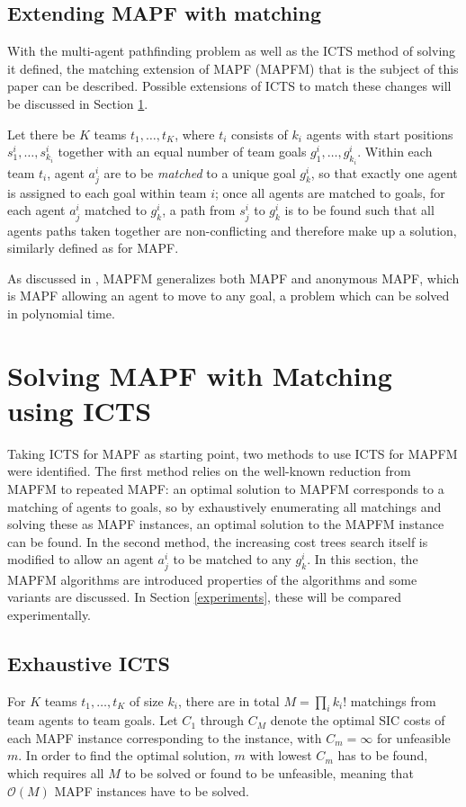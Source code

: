 \documentclass[english,10pt]{article}
\begin{document}
	\subsection{Extending MAPF with matching}
	With the multi-agent pathfinding problem as well as the ICTS method of solving it defined, the matching extension of MAPF (MAPFM) that is the subject of this paper can be described. Possible extensions of ICTS to match these changes will be discussed in Section \ref{section:icts-matching}.
	
	Let there be $K$ teams $t_1,\ldots, t_K$, where $t_i$ consists of $k_i$ agents with start positions $s_1^i,\ldots,s_{k_i}^i$ together with an equal number of team goals $g_1^i,\ldots,g_{k_i}^i$. Within each team $t_i$, agent $a_j^i$ are to be \textit{matched} to a unique goal $g_k^i$, so that exactly one agent is assigned to each goal within team $i$; once all agents are matched to goals, for each agent $a_j^i$ matched to $g_k^i$, a path from $s_j^i$ to $g_k^i$ is to be found such that all agents paths taken together are non-conflicting and therefore make up a solution, similarly defined as for MAPF.
	
	As discussed in \cite{ma2016}, MAPFM generalizes both MAPF and anonymous MAPF, which is MAPF allowing an agent to move to any goal, a problem which can be solved in polynomial time.
	\section{Solving MAPF with Matching using ICTS} %
	\label{section:icts-matching}
	Taking ICTS for MAPF as starting point, two methods to use ICTS for MAPFM were identified. The first method relies on the well-known reduction from MAPFM to repeated MAPF: an optimal solution to MAPFM corresponds to a matching of agents to goals, so by exhaustively enumerating all matchings and solving these as MAPF instances, an optimal solution to the MAPFM instance can be found. In the second method, the increasing cost trees search itself is modified to allow an agent $a_j^i$ to be matched to any $g_k^i$. In this section, the MAPFM algorithms are introduced properties of the algorithms and some variants are discussed. In Section \ref{experiments}, these will be compared experimentally.
	\subsection{Exhaustive ICTS}
	\label{exhaustive}
	For $K$ teams $t_1,\ldots,t_K$ of size $k_i$, there are in total $M = \prod_{i} k_i!$ matchings from team agents to team goals. Let $C_1$ through $C_M$ denote the optimal SIC costs of each MAPF instance corresponding to the instance, with $C_m = \infty$ for unfeasible $m$. In order to find the optimal solution, $m$ with lowest $C_m$ has to be found, which requires all $M$ to be solved or found to be unfeasible, meaning that $\mathcal{O}(M)$ MAPF instances have to be solved. 
\end{document}
